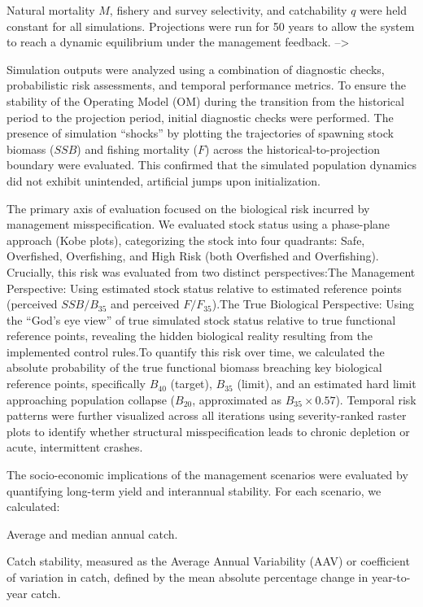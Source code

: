\documentclass[
  authoryear,
  preprint,
  3p]{elsarticle}
\begin{document}
Natural mortality \(M\), fishery and survey selectivity, and
catchability \(q\) were held constant for all simulations. Projections
were run for 50 years to allow the system to reach a dynamic equilibrium
under the management feedback. --\textgreater{}

Simulation outputs were analyzed using a combination of diagnostic
checks, probabilistic risk assessments, and temporal performance
metrics. To ensure the stability of the Operating Model (OM) during the
transition from the historical period to the projection period, initial
diagnostic checks were performed. The presence of simulation ``shocks''
by plotting the trajectories of spawning stock biomass (\(SSB\)) and
fishing mortality (\(F\)) across the historical-to-projection boundary
were evaluated. This confirmed that the simulated population dynamics
did not exhibit unintended, artificial jumps upon initialization.

The primary axis of evaluation focused on the biological risk incurred
by management misspecification. We evaluated stock status using a
phase-plane approach (Kobe plots), categorizing the stock into four
quadrants: Safe, Overfished, Overfishing, and High Risk (both Overfished
and Overfishing). Crucially, this risk was evaluated from two distinct
perspectives:The Management Perspective: Using estimated stock status
relative to estimated reference points (perceived \(SSB/B_{35}\) and
perceived \(F/F_{35}\)).The True Biological Perspective: Using the
``God's eye view'' of true simulated stock status relative to true
functional reference points, revealing the hidden biological reality
resulting from the implemented control rules.To quantify this risk over
time, we calculated the absolute probability of the true functional
biomass breaching key biological reference points, specifically
\(B_{40}\) (target), \(B_{35}\) (limit), and an estimated hard limit
approaching population collapse (\(B_{20}\), approximated as
\(B_{35} \times 0.57\)). Temporal risk patterns were further visualized
across all iterations using severity-ranked raster plots to identify
whether structural misspecification leads to chronic depletion or acute,
intermittent crashes.

The socio-economic implications of the management scenarios were
evaluated by quantifying long-term yield and interannual stability. For
each scenario, we calculated:

Average and median annual catch.

Catch stability, measured as the Average Annual Variability (AAV) or
coefficient of variation in catch, defined by the mean absolute
percentage change in year-to-year catch.
\end{document}
